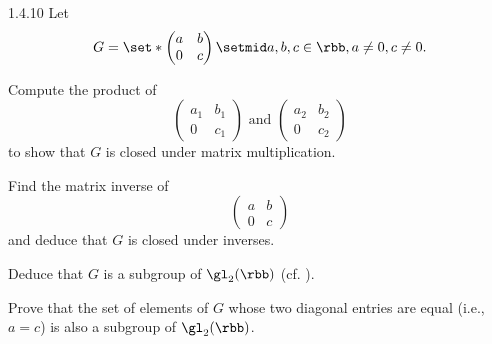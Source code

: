 \begin{exercise}{1.4.10}
    Let
    \[
    	G = 
        \set*{
            \begin{pmatrix}
                a & b \\
                0 & c
            \end{pmatrix}
            \setmid a, b, c \in \rbb, a \neq 0, c \neq 0
        }.
	\]
    \begin{subexercises}
        \item Compute the product of
        \[
            \begin{pmatrix}
                a_1 & b_1 \\
                0 & c_1
            \end{pmatrix} \text{ and }
            \begin{pmatrix}
                a_2 & b_2 \\
                0 & c_2
            \end{pmatrix}
        \]
        to show that $G$ is closed under matrix multiplication.
        \item Find the matrix inverse of
        \[
            \begin{pmatrix}
                a & b \\
                0 & c
            \end{pmatrix}
        \]
        and deduce that $G$ is closed under inverses.
        \item Deduce that $G$ is a subgroup of $\gl_2(\rbb)$ (cf. ).
        \item Prove that the set of elements of $G$ whose two diagonal entries are equal (i.e., $a = c$) is also a subgroup of $\gl_2(\rbb)$.
    \end{subexercises}
\end{exercise}

